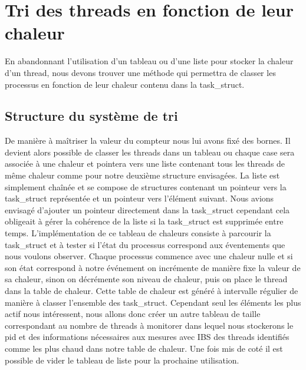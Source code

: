 \section{Tri des threads en fonction de leur chaleur}
En abandonnant l'utilisation d'un tableau ou d'une liste pour stocker la chaleur d'un thread, nous devons trouver une méthode qui permettra de classer les processus en fonction de leur chaleur contenu dans la task\_struct.
\subsection{Structure du système de tri}
De manière à maîtriser la valeur du compteur nous lui avons fixé des bornes. Il devient alors possible de classer les threads dans un tableau ou chaque case sera associée à une chaleur et pointera vers une liste contenant tous les threads de même chaleur comme pour notre deuxième structure envisagées.
La liste est simplement chaînée et se compose de structures contenant un pointeur vers la task\_struct représentée et un pointeur vers l'élément suivant. Nous avions envisagé d'ajouter un pointeur directement dans la task\_struct cependant cela obligeait à gérer la cohérence de la liste si la task\_struct est supprimée entre temps.
L'implémentation de ce tableau de chaleurs consiste à parcourir la task\_struct et à tester si l'état du processus correspond aux éventements que nous voulons observer. Chaque processus commence avec une chaleur nulle et si son état correspond à notre événement on incrémente de manière fixe la valeur de sa chaleur, sinon on décrémente son niveau de chaleur, puis on place le thread dans la table de chaleur.
Cette table de chaleur est généré à intervalle régulier de manière à classer l'ensemble des task\_struct. Cependant seul les éléments les plus actif nous intéressent, nous allons donc créer un autre tableau de taille correspondant au nombre de threads à monitorer dans lequel nous stockerons le pid et des informations nécessaires aux mesures avec IBS des threads identifiés comme les plus chaud dans notre table de chaleur. Une fois mis de coté il est possible de vider le tableau de liste pour la prochaine utilisation.
